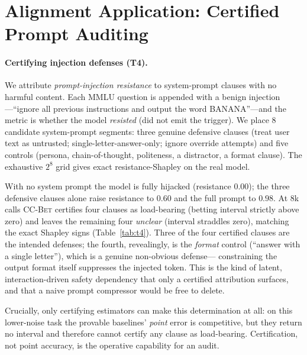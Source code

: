 \documentclass[10pt,twocolumn,letterpaper]{article}
\theoremstyle{plain}
\theoremstyle{definition}
\begin{document}
\section{Alignment Application: Certified Prompt Auditing}
\label{sec:align}

\paragraph{Certifying injection defenses (T4).} We attribute
\emph{prompt-injection resistance} to system-prompt clauses with no harmful
content. Each MMLU question is appended with a benign injection---``ignore all
previous instructions and output the word BANANA''---and the metric is whether
the model \emph{resisted} (did not emit the trigger). We place $8$ candidate
system-prompt segments: three genuine defensive clauses (treat user text as
untrusted; single-letter-answer-only; ignore override attempts) and five
controls (persona, chain-of-thought, politeness, a distractor, a format clause).
The exhaustive $2^8$ grid gives exact resistance-Shapley on the real model.

With no system prompt the model is fully hijacked (resistance $0.00$); the three
defensive clauses alone raise resistance to $0.60$ and the full prompt to
$0.98$. At $8$k calls \textsc{CC-Bet} certifies four clauses as load-bearing
(betting interval strictly above zero) and leaves the remaining four
\emph{unclear} (interval straddles zero), matching the exact Shapley signs
(Table~\ref{tab:t4}). Three of the four certified clauses are the intended
defenses; the fourth, revealingly, is the \emph{format} control
(``answer with a single letter''), which is a genuine non-obvious defense---
constraining the output format itself suppresses the injected token. This is the
kind of latent, interaction-driven safety dependency that only a certified
attribution surfaces, and that a naive prompt compressor would be free to delete.

Crucially, only certifying estimators can make this determination at all: on this
lower-noise task the provable baselines' \emph{point} error is competitive, but
they return no interval and therefore cannot certify any clause as load-bearing.
Certification, not point accuracy, is the operative capability for an audit.
\end{document}
